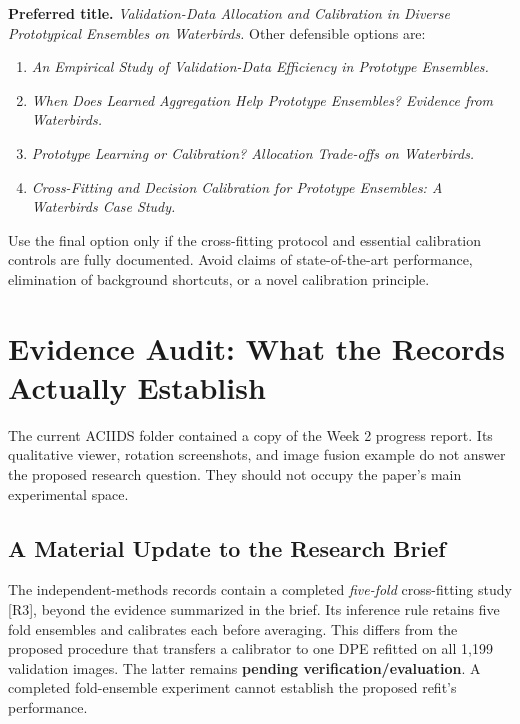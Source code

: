 \documentclass[runningheads]{llncs}
\newcommand{\status}[1]{\textbf{#1}}
\begin{document}
\textbf{Preferred title.} \emph{Validation-Data Allocation and Calibration in Diverse Prototypical Ensembles on Waterbirds.}
Other defensible options are:
\begin{enumerate}
\item \emph{An Empirical Study of Validation-Data Efficiency in Prototype Ensembles.}
\item \emph{When Does Learned Aggregation Help Prototype Ensembles? Evidence from Waterbirds.}
\item \emph{Prototype Learning or Calibration? Allocation Trade-offs on Waterbirds.}
\item \emph{Cross-Fitting and Decision Calibration for Prototype Ensembles: A Waterbirds Case Study.}
\end{enumerate}
Use the final option only if the cross-fitting protocol and essential calibration controls are fully documented. Avoid claims of state-of-the-art performance, elimination of background shortcuts, or a novel calibration principle.


\section{Evidence Audit: What the Records Actually Establish}
The current ACIIDS folder contained a copy of the Week 2 progress report. Its qualitative viewer, rotation screenshots, and image fusion example do not answer the proposed research question. They should not occupy the paper's main experimental space.

\subsection{A Material Update to the Research Brief}
The independent-methods records contain a completed \emph{five-fold} cross-fitting study [R3], beyond the evidence summarized in the brief. Its inference rule retains five fold ensembles and calibrates each before averaging. This differs from the proposed procedure that transfers a calibrator to one DPE refitted on all 1,199 validation images. The latter remains \status{pending verification/evaluation}. A completed fold-ensemble experiment cannot establish the proposed refit's performance.

\begin{table}[ht]
\centering\small
\caption{Recomputed exploratory test results from [R3]. WGA is mean $\pm$ sample SD across five standard-ERM or two ERM$^*$ sources; OA is mean overall accuracy. All entries are percentages. P0 uses 720/479 images. The four original-head cross-fitted affine settings are all shown, without selecting a test winner.}
\label{tab:evidence}

\end{table}
\end{document}
